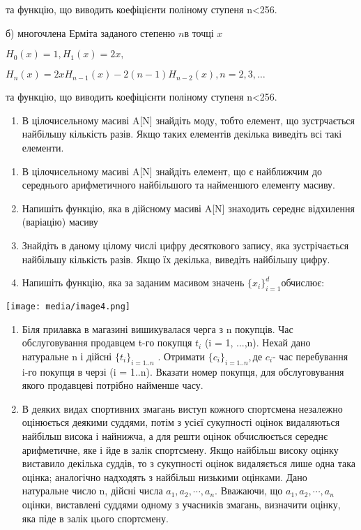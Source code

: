 \documentclass[]{article}
\begin{document}
та функцію, що виводить коефіцієнти поліному ступеня n\textless{}256.

б) многочлена Ерміта заданого степеню \(n\)в точці \(x\)

\(H_{0}(x) = 1,H_{1}(x) = 2x,\)

\(H_{n}(x) = 2xH_{n - 1}(x) - 2(n - 1)H_{n - 2}(x),n = 2,3,\ldots\)

та функцію, що виводить коефіцієнти поліному ступеня n\textless{}256.

\begin{enumerate}
\def\labelenumi{\arabic{enumi})}
\setcounter{enumi}{12}
\item
  В цілочисельному масиві A{[}N{]} знайдіть моду, тобто елемент, що
  зустрчається найбільшу кількість разів. Якщо таких елементів декілька
  виведіть всі такі елементи.
\end{enumerate}

\begin{enumerate}
\def\labelenumi{\arabic{enumi})}
\setcounter{enumi}{12}
\item
  В цілочисельному масиві A{[}N{]} знайдіть елемент, що є найближчим до
  середнього арифметичного найбільшого та найменшого елементу масиву.
\item
  Напишіть функцію, яка в дійсному масиві A{[}N{]} знаходить середнє
  відхилення (варіацію) масиву
\item
  Знайдіть в даному цілому числі цифру десяткового запису, яка
  зустрічається найбільшу кількість разів. Якщо їх декілька, виведіть
  найбільшу цифру.
\item
  Напишіть функцію, яка за заданим масивом значень
  \({\{ x_{i}\}}_{i = 1}^{d}\)обчислює:
\end{enumerate}

\texttt{[image: media/image4.png]}

\begin{enumerate}
\def\labelenumi{\arabic{enumi})}
\setcounter{enumi}{12}
\item
  Біля прилавка в магазині вишикувалася черга з n покупців. Час
  обслуговування продавцем t-го покупця \(t_{i}\) (i = 1, ...,n). Нехай
  дано натуральне n і дійсні \({\{ t_{i}\}}_{i = 1..n}\) . Отримати
  \({\{ c_{i}\}}_{i = 1..n},\)де \(c_{i}\)- час перебування i-го покупця
  в черзі (i = 1..n). Вказати номер покупця, для обслуговування якого
  продавцеві потрібно найменше часу.
\item
  В деяких видах спортивних змагань виступ кожного спортсмена незалежно
  оцінюється деякими суддями, потім з усієї сукупності оцінок
  видаляються найбільш висока і найнижча, а для решти оцінок
  обчислюється середнє арифметичне, яке і йде в залік спортсмену. Якщо
  найбільш високу оцінку виставило декілька суддів, то з сукупності
  оцінок видаляється лише одна така оцінка; аналогічно надходять з
  найбільш низькими оцінками. Дано натуральне число n, дійсні числа
  \(a_{1},a_{2},\cdots,a_{n}\). Вважаючи, що
  \(a_{1},a_{2},\cdots,a_{n}\)оцінки, виставлені суддями одному з
  учасників змагань, визначити оцінку, яка піде в залік цього
  спортсмену.
\end{enumerate}
\end{document}
